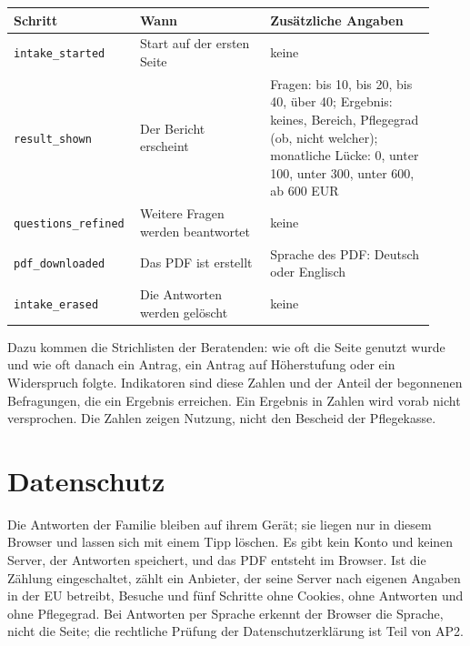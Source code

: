 \documentclass[11pt,a4paper,parskip=half-]{scrartcl}
\begin{document}
\begingroup\small
\begin{longtable}{@{}L{0.24\linewidth}L{0.30\linewidth}L{0.38\linewidth}@{}}
\toprule
\textbf{Schritt} & \textbf{Wann} & \textbf{Zusätzliche Angaben} \\
\midrule
\endhead
\texttt{intake\_started} & Start auf der ersten Seite & keine \\
\texttt{result\_shown} & Der Bericht erscheint &
  Fragen: bis 10, bis 20, bis 40, über 40; Ergebnis: keines, Bereich, Pflegegrad (ob, nicht welcher);
  monatliche Lücke: 0, unter 100, unter 300, unter 600, ab 600 EUR \\
\texttt{questions\_refined} & Weitere Fragen werden beantwortet & keine \\
\texttt{pdf\_downloaded} & Das PDF ist erstellt & Sprache des PDF: Deutsch oder Englisch \\
\texttt{intake\_erased} & Die Antworten werden gelöscht & keine \\
\bottomrule
\end{longtable}
\endgroup

Dazu kommen die Strichlisten der Beratenden: wie oft die Seite genutzt wurde und wie oft danach
ein Antrag, ein Antrag auf Höherstufung oder ein Widerspruch folgte.
Indikatoren sind diese Zahlen und der Anteil der begonnenen Befragungen, die ein Ergebnis erreichen.
Ein Ergebnis in Zahlen wird vorab nicht versprochen.
Die Zahlen zeigen Nutzung, nicht den Bescheid der Pflegekasse.

\section{Datenschutz}
Die Antworten der Familie bleiben auf ihrem Gerät; sie liegen nur in diesem Browser und lassen sich
mit einem Tipp löschen.
Es gibt kein Konto und keinen Server, der Antworten speichert, und das PDF entsteht im Browser.
Ist die Zählung eingeschaltet, zählt ein Anbieter, der seine Server nach eigenen Angaben in der EU
betreibt, Besuche und fünf Schritte ohne Cookies, ohne Antworten und ohne Pflegegrad.
Bei Antworten per Sprache erkennt der Browser die Sprache, nicht die Seite; die rechtliche Prüfung
der Datenschutzerklärung ist Teil von AP2.

\end{document}
